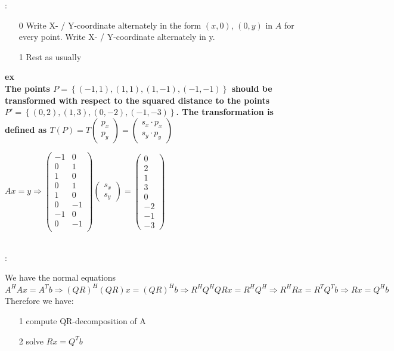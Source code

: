 \documentclass[7pt,landscape, margin = 0.1mm]{article}
\newcommand{\COL}[1]{ \color{chaptercolor} \bf{#1}\color{black}     \\}
\newcommand{\KRZ}[2]{\vspace{1mm} \hline \vspace{1mm} \color{chaptercolor}{RC #1}:\color{black} \   \hspace{0.2cm}\vspace{1mm}   {\begin{minipage}{20em}
#2 \end{minipage}} \vspace{1mm}  \hline \vspace{1mm}  \\}
\begin{document}
\begin{multicols}{4}
\begin{flushleft}
\KRZ{Least Square Method for 2D-points}{
\begin{itemize}
\item[0] Write X- / Y-coordinate alternately in the form $(x , 0)$, $(0,y)$ in $A$ for every point.  Write X- / Y-coordinate alternately in y.
\item[1] Rest as usually
\end{itemize}
\COL{ex} The points $P = \left\{(-1,1),(1,1),(1,-1),(-1,-1) \right\}$ should be transformed with respect to the squared distance to the points $P' = \left\{(0,2),(1,3),(0,-2),(-1,-3) \right\}$. The transformation is defined as $T(P) = T \left ( \begin{smallmatrix}
 p_x\\p_y
\end{smallmatrix} \right ) = \left ( \begin{smallmatrix}
 s_x \cdot p_x\\s_y \cdot p_y
\end{smallmatrix} \right ) $

 $Ax = y \Rightarrow \begin{pmatrix}
 -1&0  \\
 0&1  \\
 1&0  \\
 0& 1 \\
 1&0  \\
 0&-1  \\
 -1&0  \\
 0& -1 \\
\end{pmatrix} \begin{pmatrix}
s_x \\ s_y
\end{pmatrix} = \begin{pmatrix}
 0\\
 2\\
 1\\
3 \\
0 \\
-2 \\
-1 \\
-3
\end{pmatrix}$

}




\KRZ{Least Squares with QR-decomposition}{We have the normal equations $A^HAx = A^Tb \Rightarrow (QR)^H (QR)x = (QR)^H b \Rightarrow R^HQ^H QRx= R^HQ^H \Rightarrow R^HRx = R^TQ^Tb \Rightarrow Rx = Q^Hb$ Therefore we have: \begin{itemize}
\item[1] compute QR-decomposition of A
\item[2] solve $Rx = Q^Tb$
\end{itemize}}




\end{flushleft}
\end{multicols}
\end{document}
